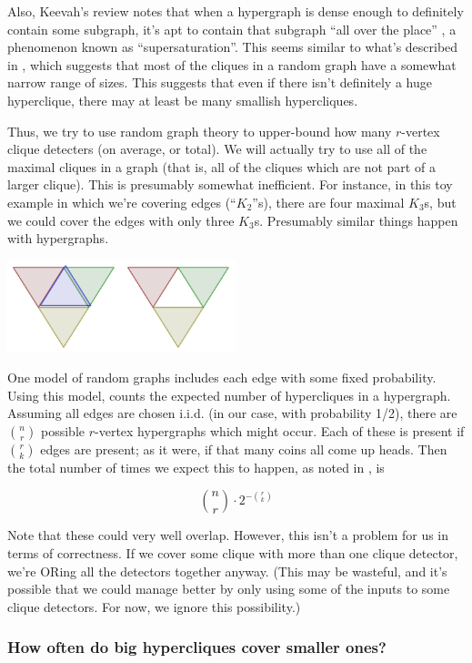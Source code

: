 \documentclass[12pt]{article}
\theoremstyle{definition}
\begin{document}
Also, Keevah's review notes that when a hypergraph is dense enough to
definitely contain some subgraph, it's apt to contain that subgraph
``all over the place'' \cite{keevash2011hypergraph}, a phenomenon
known as ``supersaturation''.  This seems similar to what's
described in \cite{bollobas1976cliques}, which suggests that most of
the cliques in a random graph have a somewhat narrow range of sizes.
This suggests that even if there isn't definitely a huge hyperclique,
there may at least be many smallish hypercliques.

Thus, we try to use random graph theory to upper-bound how many
$r$-vertex clique detecters (on average, or total). We will actually
try to use all of the maximal cliques in a graph (that is, all of the
cliques which are not part of a larger clique). This is presumably
somewhat inefficient.
For instance, in this toy example in which we're covering edges
(``$K_2$''s), there
are four maximal $K_3$s, but we could cover the edges with
only three $K_3$s.
Presumably similar things happen with hypergraphs.

\includegraphics[width=0.5\textwidth]{R/maximal.pdf}

One model of random graphs
includes each edge with some fixed probability. Using this model,
\cite{bollobas1976cliques}
counts the expected number of hypercliques in a hypergraph. Assuming all
edges are chosen i.i.d. (in our case, with probability 1/2),
there are ${n \choose r}$ possible $r$-vertex hypergraphs which might
occur. Each of these is present if ${r \choose k}$ edges are present; as it
were, if that many coins all come up heads. Then the total number of times
we expect this to happen, as noted in \cite{bollobas1976cliques}, is

\[
{n \choose r} \cdot 2^{-{r \choose k}}
\]

Note that these could very well overlap. However, this isn't a problem for
us in terms of correctness. If we cover some clique
with more than one
clique detector, we're
ORing all the detectors together anyway. (This may be wasteful, and it's
possible that we could manage better by only using some of the inputs to
some clique detectors. For now, we ignore this possibility.)

\subsubsection{How often do big hypercliques cover smaller ones?}
\end{document}
